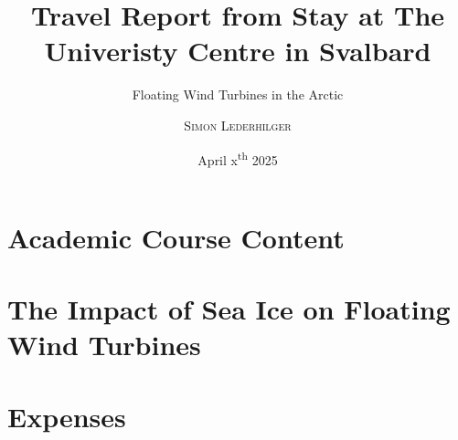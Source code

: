 \documentclass{article}
\title{Travel Report from Stay at The Univeristy Centre in Svalbard}
\subtitle{Floating Wind Turbines in the Arctic}
\author{\textsc{Simon Lederhilger}}
\date{April x\textsuperscript{th} 2025}
\begin{document}
\maketitle\thispagestyle{fancy}
    \begin{multicols*}{2}
        \section{Academic Course Content}
        

        \section{The Impact of Sea Ice on Floating Wind Turbines}
        

        \section{Expenses}
    \end{multicols*}
\end{document}
